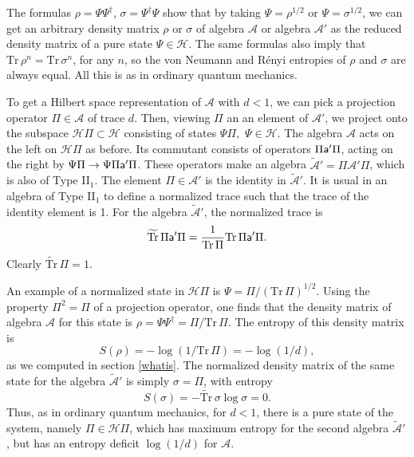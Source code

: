 \documentclass[11pt,a4paper]{article}
\def\t{{ \sf t}}
\def\a{{\sf a}}
\def\be{\begin{equation}}
\def\ee{\end{equation}}
\def\A{{\mathcal A}}
\def\t{\widetilde }
\def\H{{\mathcal H}}
\def\Tr{{\mathrm{Tr}}}
\begin{document}
The formulas $\rho=\Psi\Psi^\dagger$, $\sigma=\Psi^\dagger\Psi$ show that by taking $\Psi=\rho^{1/2}$ or $\Psi=\sigma^{1/2}$, we can get an arbitrary density
matrix $\rho$ or $\sigma$ of algebra $\A$ or algebra $\A'$ as the reduced density matrix of a pure state $\Psi\in\H$.    
The same formulas also imply that $\Tr\,\rho^n=\Tr\,\sigma^n$, for any $n$, so the von Neumann and R\'{e}nyi entropies
of $\rho$ and $\sigma$ are always equal.   All this is as in ordinary quantum mechanics.

To get a Hilbert space representation of $\A$ with $d<1$, we can pick a projection operator $\Pi\in \A$ of trace $d$.   Then, viewing $\Pi$ an an element of $\A'$,
we project onto the subspace $\H\Pi\subset \H$ consisting of states $\Psi\Pi,$ $\Psi\in\H$.   The algebra $\A$ acts on the left on $\H\Pi$ as before.   Its
commutant consists of operators $\Pi\a'\Pi$, acting on the right by $\Psi\Pi\to \Psi\Pi\a'\Pi$.   These operators make an algebra $\t \A'=\Pi\A'\Pi$, which is also
of Type II$_1$.   The element $\Pi\in\A'$ is the identity in $\t\A'$.  It is usual in an algebra of Type II$_1$ to define a normalized trace such that the trace of the identity
element is 1. For the algebra $\t\A'$, the normalized trace is
\be\label{normtr}\t\Tr\,\Pi\a'\Pi=\frac{1}{\Tr\,\Pi}\Tr\,\Pi\a'\Pi. \ee   Clearly $\t\Tr\,\Pi=1$.

An example of a normalized state in $\H\Pi$ is $\Psi=\Pi/(\Tr\,\Pi)^{1/2}$.   Using the property $\Pi^2=\Pi$ of a projection operator,
one finds  that the density matrix of algebra $\A$ for this state is $\rho=\Psi\Psi^\dagger=\Pi/\Tr\,\Pi$.   The entropy of this density matrix is
\be\label{denred}S(\rho)=-\log (1/\Tr\,\Pi)=-\log (1/d), \ee
as we computed in section \ref{whatis}.   The normalized density matrix of the same state for the algebra $\t\A'$ is simply $\sigma=\Pi$, with entropy
\be\label{wenred}S(\sigma)=-\t\Tr\,\sigma\log\sigma=0. \ee
Thus, as in ordinary quantum mechanics, for $d<1$, there is a pure state of the system, namely $\Pi\in \H\Pi$, which has maximum entropy for the second
algebra $\t\A'$, but has an entropy deficit $\log(1/d)$ for  $\A$.
\end{document}
